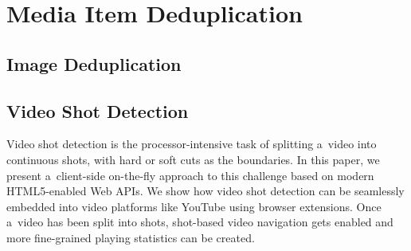 

\chapter{Media Item Deduplication}

\ifpdf
    \graphicspath{{6_media_item_deduplication/figures/PNG/}{6_media_item_deduplication/figures/PDF/}{6_media_item_deduplication/figures/}}
\else
    \graphicspath{{6_media_item_deduplication/figures/EPS/}{6_media_item_deduplication/figures/}}
\fi


\section{Image Deduplication}

\section{Video Shot Detection}
Video shot detection is the processor-intensive task of splitting a~video into continuous shots, with hard or soft cuts as the boundaries. In this paper, we present a~client-side on-the-fly approach to this challenge based on modern HTML5-enabled Web APIs. We show how video shot detection can be seamlessly embedded into video platforms like YouTube using browser extensions. Once a~video has been split into shots, shot-based video navigation gets enabled and more fine-grained playing statistics can be created.

